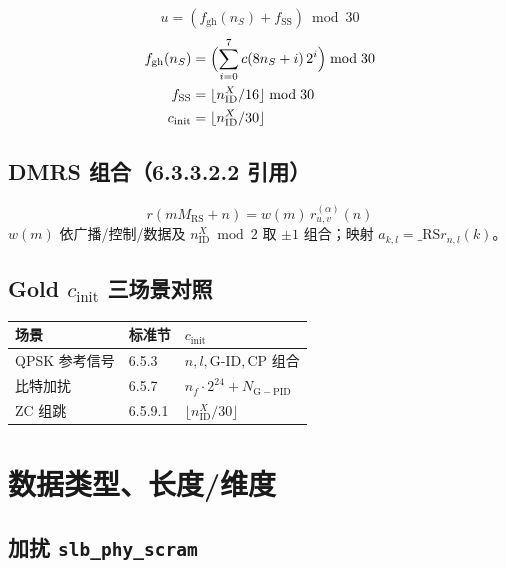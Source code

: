 \documentclass[11pt,a4paper]{ctexart}
\newcommand{\NGPID}{N_{\mathrm{G-PID}}}
\begin{document}
\begin{equation}
  u = (f_{\mathrm{gh}}(n_S) + f_{\mathrm{SS}}) \bmod 30
  \label{eq:group_hop}
\end{equation}
\begin{align}
  f_{\mathrm{gh}}(n_S) &= \Bigl(\sum_{i=0}^{7} c(8n_S+i)\,2^i\Bigr) \bmod 30 \\
  f_{\mathrm{SS}} &= \lfloor n_{\mathrm{ID}}^{X}/16\rfloor \bmod 30 \\
  c_{\mathrm{init}} &= \lfloor n_{\mathrm{ID}}^{X}/30\rfloor
\end{align}

\subsection{DMRS 组合（6.3.3.2.2 引用）}

\begin{equation}
  r(m M_{\mathrm{RS}} + n) = w(m)\, r_{u,v}^{(\alpha)}(n)
\end{equation}
$w(m)$ 依广播/控制/数据及 $n_{\mathrm{ID}}^{X}\bmod 2$ 取 $\pm1$ 组合；映射 $a_{k,l}=\_{\mathrm{RS}} r_{n,l}(k)$。

\subsection{Gold $c_{\mathrm{init}}$ 三场景对照}

\begin{table}[h]
\centering
\small
\begin{tabular}{lll}
\toprule
\textbf{场景} & \textbf{标准节} & \textbf{$c_{\mathrm{init}}$} \\
\midrule
QPSK 参考信号 & 6.5.3 & $n,l,\mathrm{G\text{-}ID},\mathrm{CP}$ 组合 \\
比特加扰 & 6.5.7 & $n_f\cdot 2^{24}+\NGPID$ \\
ZC 组跳 & 6.5.9.1 & $\lfloor n_{\mathrm{ID}}^{X}/30\rfloor$ \\
\bottomrule
\end{tabular}
\end{table}

\section{数据类型、长度/维度}

\subsection{加扰 \texttt{slb\_phy\_scram}}
\end{document}
